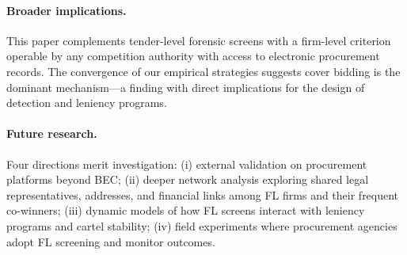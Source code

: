 \paragraph{Broader implications.}
This paper complements tender-level forensic screens with a firm-level
criterion operable by any competition authority with access to electronic
procurement records. The convergence of our empirical strategies suggests
cover bidding is the dominant mechanism---a finding with direct
implications for the design of detection and leniency programs.

\paragraph{Future research.}
Four directions merit investigation: (i) external validation on
procurement platforms beyond BEC; (ii) deeper network analysis exploring
shared legal representatives, addresses, and financial links among FL
firms and their frequent co-winners; (iii) dynamic models of how FL
screens interact with leniency programs and cartel stability; (iv)
field experiments where procurement agencies adopt FL screening and
monitor outcomes.
